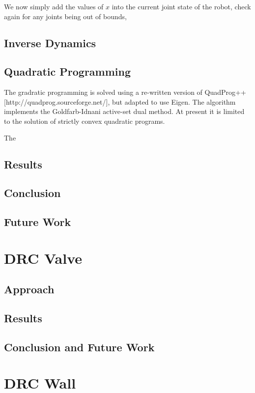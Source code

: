 \documentclass{article}
\begin{document}
We now simply add the values of $x$ into the current joint state of the robot, check again for any joints being out of bounds, 


\subsection{Inverse Dynamics}

\subsection{Quadratic Programming}

The gradratic programming is solved using a re-written version of QuadProg++[http://quadprog.sourceforge.net/], but adapted to use Eigen. The algorithm implements the Goldfarb-Idnani active-set dual method. At present it is limited to the solution of strictly convex quadratic programs. \cite{quadprog}

The 

\subsection{Results}

\subsection{Conclusion}

\subsection{Future Work}

\section{DRC Valve}
\subsection{Approach}
\subsection{Results}
\subsection{Conclusion and Future Work}

\section{DRC Wall}
\end{document}
